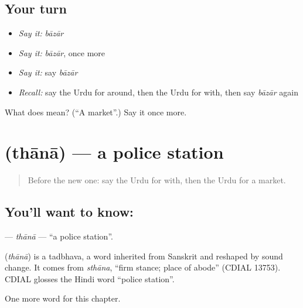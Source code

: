 \subsection*{Your turn}
\begin{itemize}
\raggedright
  \item \emph{Say it:} \emph{bāzār}
  \item \emph{Say it:} \emph{bāzār}, once more
  \item \emph{Say it:} say \emph{bāzār}
  \item \emph{Recall:} say the Urdu for around, then the Urdu for with, then say \emph{bāzār} again
\end{itemize}

\begin{tcolorbox}[breakable,colback=teal!4,colframe=teal!35!black,title={Before you move on}]
What does  mean? (\textquotedblleft{}A market\textquotedblright{}.) Say it once more.
\end{tcolorbox}
\section[\texorpdfstring{\ur{تھانہ} (thānā)}{تھانہ (thānā)}]{ (thānā) — a police station}

\label{lesson:UR-C100-thana}



\begin{quote}
Before the new one: say the Urdu for with, then the Urdu for a market.
\end{quote}

\subsection*{You'll want to know: }
\textbf{} — \emph{thānā} — \textquotedblleft{}a police station\textquotedblright{}.

\begin{cousinweb}
\textbf{} (\emph{thānā}) is a tadbhava, a word inherited from Sanskrit and reshaped by sound change. It comes from \emph{sthāna}, \textquotedblleft{}firm stance; place of abode\textquotedblright{} (CDIAL 13753). CDIAL glosses the Hindi word \textquotedblleft{}police station\textquotedblright{}.
\end{cousinweb}

\begin{grammarlens}[title={What you've built}]
One more word for this chapter.
\end{grammarlens}

